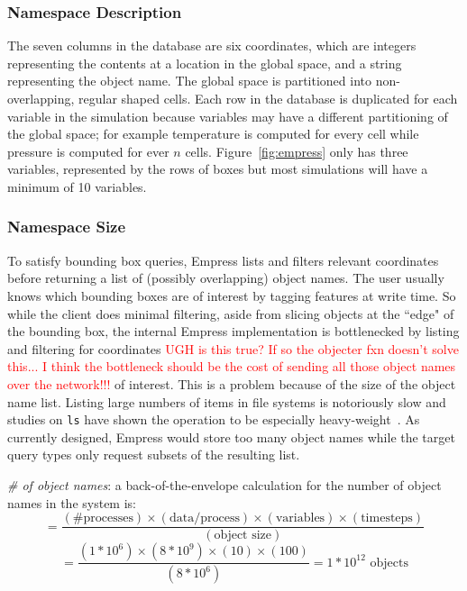 \subsubsection{Namespace Description}

The seven columns in the database are six coordinates, which are integers
representing the contents at a location in the global space, and a string
representing the object name. The global space is partitioned into
non-overlapping, regular shaped cells.  Each row in the database is duplicated
for each variable in the simulation because variables may have a different
partitioning of the global space; for example temperature is computed for every
cell while pressure is computed for ever \(n\) cells.  Figure~\ref{fig:empress}
only has three variables, represented by the rows of boxes but most simulations
will have a minimum of 10 variables.

\subsubsection{Namespace Size}

To satisfy bounding box queries, Empress lists and filters relevant coordinates
before returning a list of (possibly overlapping) object names. The user
usually knows which bounding boxes are of interest by tagging features at write
time. So while the client does minimal filtering, aside from slicing objects at
the ``edge" of the bounding box, the internal Empress implementation is
bottlenecked by listing and filtering for coordinates \textcolor{red}{UGH is
this true? If so the objecter fxn doesn't solve this... I think the bottleneck
should be the cost of sending all those object names over the network!!!}
of interest. This is a problem because of the size of the object name list.
Listing large numbers of items in file systems is notoriously slow and studies
on \texttt{ls} have shown the operation to be especially
heavy-weight~\cite{carns:ipdps09-pvfs, eshel:fast10-panache}.  As currently
designed, Empress would store too many object names while the target query
types only request subsets of the resulting list.

\emph{\# of object names}: a back-of-the-envelope calculation for the number of
object names in the system is:
\[=\frac
  {(\text{\# processes})\times
   (\text{data/process})\times
   (\text{variables})\times
   (\text{timesteps})}
  {(\text{object size})}
\]
\[=\frac
  {(1*10^6)\times
   (8*10^{9})\times
   (10)\times
   (100)}
   {(8*10^6)}
  = 1*10^{12}
\text{ objects} \]


